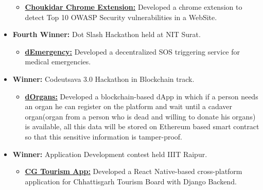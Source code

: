 \documentclass{article}
\begin{document}
\begin{itemize}[noitemsep,nolistsep,leftmargin=*]
{        \begin{itemize}
            \item \normalsize \href{https://github.com/siddharthshah3030/choukidar-owasp-security-chrome-extension}{\textbf{Choukidar Chrome Extension:}} Developed a chrome extension to detect Top 10 OWASP Security vulnerabilities in a WebSite.
        \end{itemize}
    }
    \item { \normalsize \textbf{Fourth Winner:} Dot Slash Hackathon held at NIT Surat. 
        \begin{itemize}
            \item \normalsize \href{https://bit.ly/31wXfMr}{\textbf{dEmergency:}} Developed a decentralized SOS triggering service for medical emergencies.
        \end{itemize}
    }
    \item { \normalsize \textbf{Winner:} Codeutsava 3.0 Hackathon in Blockchain track.
        \begin{itemize}
            \item \normalsize \href{https://bit.ly/healthJ}{\textbf{dOrgans:}} Developed a blockchain-based dApp in which if a person needs an organ he can register on the platform and wait until a cadaver organ(organ from a person who is dead and willing to donate his organs) is available, all this data will be stored on Ethereum based smart contract so that this sensitive information is tamper-proof.
        \end{itemize}
    }
    \item { \normalsize \textbf{Winner:} Application Development contest held IIIT Raipur. 
        \begin{itemize}
            \item \normalsize \href{https://bit.ly/CG_App}{\textbf{CG Tourism App:}} Developed a React Native-based cross-platform application for Chhattisgarh Tourism Board with Django Backend.
        \end{itemize}
    }
\end{itemize}
\end{document}
